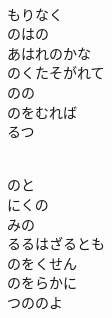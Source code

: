 \documentclass[10pt,b5j]{tarticle} %
\begin{document}
\begin{enumerate}
\begin{minipage}[c]{\blocksize}
        \vspace{\linespace}
        \item~\\
        もりなく\\
        のはの\\
        あはれのかな\\
        のくたそがれて\\
        のの\\
        のをむれば\\
        るつ
        
    \end{minipage}
    \begin{minipage}[c]{\blocksize}
        
        \vspace{\linespace}
        \item~\\
        のと\\
        にくの\\
        みの\\
        るるはざるとも\\
        のをくせん\\
        のをらかに\\
        つののよ
    
    \end{minipage}
\end{enumerate} %
\end{document}

